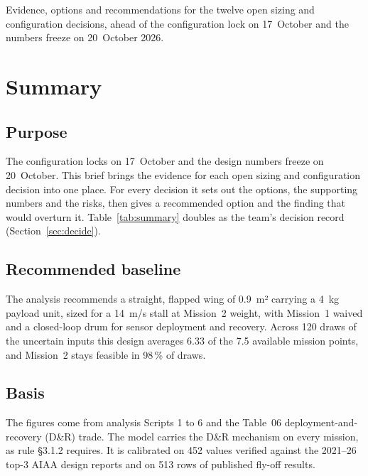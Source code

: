 \documentclass[final]{dbfdoc}
\begin{document}
\briefcover
  {Evidence, options and recommendations for the twelve open sizing and configuration decisions, ahead of the configuration lock on 17~October and the numbers freeze on 20~October 2026.}
  {%
   }
  {%
   }

\section{Summary}
\subsection{Purpose}
The configuration locks on 17~October and the design numbers freeze on 20~October. This brief brings the evidence for each open sizing and configuration decision into one place. For every decision it sets out the options, the supporting numbers and the risks, then gives a recommended option and the finding that would overturn it. Table~\ref{tab:summary} doubles as the team's decision record (Section~\ref{sec:decide}).

\subsection{Recommended baseline}
The analysis recommends a straight, flapped wing of 0.9~m² carrying a 4~kg payload unit, sized for a 14~m/s stall at Mission~2 weight, with Mission~1 waived and a closed-loop drum for sensor deployment and recovery. Across 120 draws of the uncertain inputs this design averages 6.33 of the 7.5 available mission points, and Mission~2 stays feasible in 98\,\% of draws.

\subsection{Basis}
The figures come from analysis Scripts 1 to 6 and the Table~06 deployment-and-recovery (D\&R) trade. The model carries the D\&R mechanism on every mission, as rule §3.1.2 requires. It is calibrated on 452 values verified against the 2021--26 top-3 AIAA design reports and on 513 rows of published fly-off results.
\end{document}
